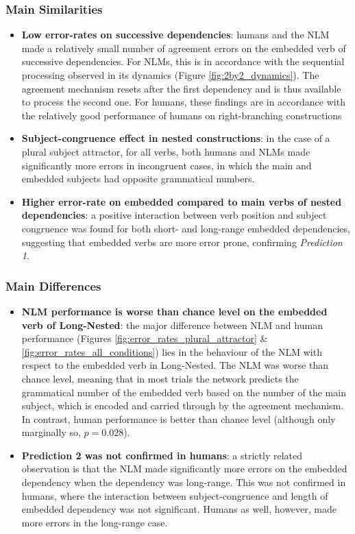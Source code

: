 \subsubsection{Main Similarities}
\begin{itemize}
    \item \textbf{Low error-rates on successive dependencies}: humans and the NLM made a relatively small number of agreement errors on the embedded verb of successive dependencies. For NLMs, this is in accordance with the sequential processing observed in its dynamics (Figure \ref{fig:2by2_dynamics}). The agreement mechanism resets after the first dependency and is thus available to process the second one. For humans, these findings are in accordance with the relatively good performance of humans on right-branching constructions \citep[e.g., ][]{blaubergs1974short, miller1964free}
    \item \textbf{Subject-congruence effect in nested constructions}: in the case of a plural subject attractor, for all verbs, both humans and NLMs made significantly more errors in incongruent cases, in which the main and embedded subjects had opposite grammatical numbers.
    \item \textbf{Higher error-rate on embedded compared to main verbs of nested dependencies}: a positive interaction between verb position and subject congruence was found for both short- and long-range embedded dependencies, suggesting that embedded verbs are more error prone, confirming \textit{Prediction 1}.

    
\end{itemize}

\subsubsection{Main Differences}
    \begin{itemize}
        \item \textbf{NLM performance is worse than chance level on the embedded verb of Long-Nested}: the major difference between NLM and human performance (Figures \ref{fig:error_rates_plural_attractor} \& \ref{fig:error_rates_all_conditions}) lies in the behaviour of the NLM with respect to the embedded verb in Long-Nested. The NLM was worse than chance level, meaning that in most trials the network predicts the grammatical number of the embedded verb based on the number of the main subject, which is encoded and carried through by the agreement mechanism. In contrast, human performance is better than chance level (although only marginally so, $p = 0.028$).
        \item \textbf{Prediction 2 was not confirmed in humans}: a strictly related observation is that the NLM made significantly more errors on the embedded dependency when the dependency was long-range. This was not confirmed in humans, where the interaction between subject-congruence and length of embedded dependency was not significant. Humans as well, however, made more errors in the long-range case.
    \end{itemize}
    

